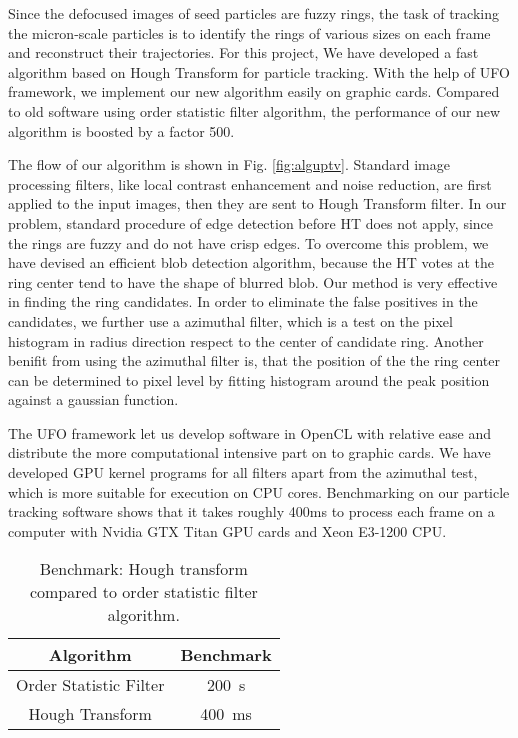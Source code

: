 \documentclass{article}
\begin{document}
Since the defocused images of seed particles are fuzzy rings, the task of
tracking the micron-scale particles is to identify the rings of various sizes
on each frame and reconstruct their trajectories. For this project, We have
developed a fast algorithm based on Hough Transform for particle tracking.
With the help of UFO framework, we implement our new algorithm easily on
graphic cards. Compared to old software using order statistic filter algorithm,
the performance of our new algorithm is boosted by a factor 500.

The flow of our algorithm is shown in Fig. \ref{fig:alguptv}.  Standard image
processing filters, like local contrast enhancement and noise reduction, are
first applied to the input images, then they are sent to Hough Transform
filter. In our problem, standard procedure of edge detection before HT does not
apply, since the rings are fuzzy and do not have crisp edges. To overcome this
problem, we have devised an efficient blob detection algorithm, because the HT
votes at the ring center tend to have the shape of blurred blob.  Our method is
very effective in finding the ring candidates. In order to eliminate the false
positives in the candidates, we further use a azimuthal filter, which is a test
on the pixel histogram in radius direction respect to the center of candidate
ring. Another benifit from using the azimuthal filter is,  that the position of
the the ring center can be determined to pixel level by fitting histogram around
the peak position against a gaussian function.


The UFO framework let us develop software in OpenCL with relative ease and
distribute the more computational intensive part on to graphic cards. We have
developed GPU kernel programs for all filters apart from the azimuthal test,
which is more suitable for execution on CPU cores. Benchmarking on our particle
tracking software shows that it takes roughly 400ms to process each frame on a
computer with Nvidia GTX Titan GPU cards and Xeon E3-1200 CPU.  



\begin{table}[t]
\centering
\begin{tabular}{c c}
\hline
\textbf{Algorithm} & \textbf{Benchmark} \\
\hline
Order Statistic Filter & 200~s \\
Hough Transform & 400~ms \\
\hline
\end{tabular}
\caption{Benchmark: Hough transform compared to order statistic filter algorithm.}
\end{table}
\end{document}
